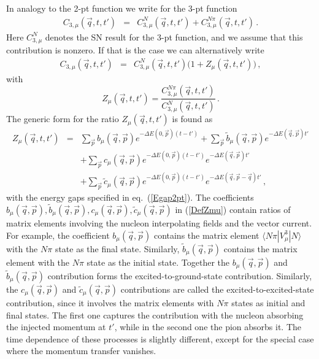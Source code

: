 \documentclass[11pt,prd,aps,showpacs,eqsecnum,floatfix,nofootinbib,preprint,tightenlines]{revtex4}
\newcommand{\nn}{\nonumber}
\newcommand{\pref}[1]{(\ref{#1})}
\newcommand{\np}{N\pi}
\begin{document}
In analogy to the 2-pt function we write for the 3-pt function
\begin{eqnarray}
C_{3,\mu}(\vec{q},t,t') & = & C^N_{3,\mu}(\vec{q},t,t') + C^{\np}_{3,\mu}(\vec{q},t,t')\,.\label{DefC3NpcontrA}
\end{eqnarray}
Here $C^N_{3,\mu}$ denotes the SN result for the 3-pt function, and we assume that this contribution is nonzero. If that is the case we can alternatively write
\begin{eqnarray}
C_{3,\mu}(\vec{q},t,t') & =& C^N_{3,\mu}(\vec{q},t,t')\bigg(1+ Z_{\mu}(\vec{q},t,t')\bigg) \,,\label{DefZ}
\end{eqnarray}
with 
\begin{equation}\label{IntroZmu}
Z_{\mu}(\vec{q},t,t') =\frac{C^{N\pi}_{3,\mu}(\vec{q},t,t')}{C^N_{3,\mu}(\vec{q},t,t')}\,.
\end{equation} 
The generic form for the ratio $Z_{\mu}(\vec{q},t,t')$ is found as
\begin{eqnarray}
Z_{\mu}(\vec{q},t,t') & = &  \sum_{\vec{p}} b_{\mu}(\vec{q},\vec{p}) e^{-\Delta E(0,\vec{p}) (t-t')}+\sum_{\vec{p}}\tilde{b}_{\mu}(\vec{q},\vec{p}) e^{-\Delta E(\vec{q},\vec{p}) t'} \nn\\
& & +  \sum_{\vec{p}} c_{\mu}(\vec{q},\vec{p}) e^{-\Delta E(0,\vec{p}) (t-t')}e^{-\Delta E(\vec{q},\vec{p}) t'}\label{DefZmu}\\
& & +  \sum_{\vec{p}} \tilde{c}_{\mu}(\vec{q},\vec{p}) e^{-\Delta E(0,\vec{p}) (t-t')}e^{-\Delta E(\vec{q},\vec{p}-\vec{q}) t'}\,,\nn
\end{eqnarray}
with the energy gaps specified in eq.\ \pref{Egap2pt}. 
The coefficients $b_{\mu}(\vec{q},\vec{p}) ,\tilde{b}_{\mu}(\vec{q},\vec{p}), c_{\mu}(\vec{q},\vec{p}), \tilde{c}_{\mu}(\vec{q},\vec{p})$ in \pref{DefZmu} contain ratios of matrix elements involving the nucleon interpolating fields and the vector current. For example, the coefficient $b_{\mu}(\vec{q},\vec{p})$ contains the matrix element $\langle N\pi |V_{\mu}^3|N \rangle$ with the $N\pi$ state as the final state.  Similarly, $\tilde{b}_{\mu}(\vec{q},\vec{p})$ contains the matrix element with the $N\pi$ state as the initial state. Together the $b_{\mu}(\vec{q},\vec{p})$ and $\tilde{b}_{\mu}(\vec{q},\vec{p})$ contribution forms the excited-to-ground-state contribution. Similarly, the $c_{\mu}(\vec{q},\vec{p})$ and $\tilde{c}_{\mu}(\vec{q},\vec{p})$ contributions are called the excited-to-excited-state contribution, since it involves the matrix elements with $N\pi$ states as initial and final states. The first one captures the contribution with the nucleon absorbing the injected momentum at $t'$, while in the second one the pion absorbs it. The time dependence of these processes is slightly different, except for the special case where the momentum transfer vanishes.
\end{document}
